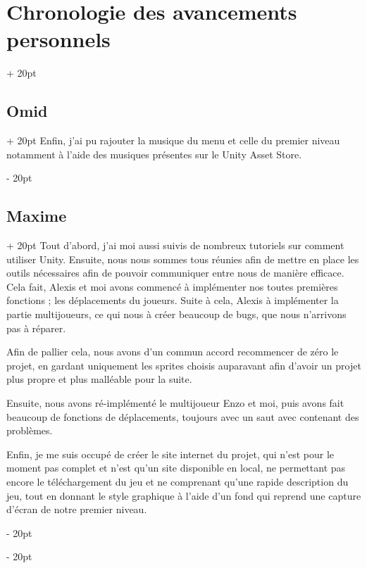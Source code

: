 \documentclass[a4paper, 12pt, twoside]{article}
\newcommand{\ind}[1][20pt]{\advance\leftskip + #1}
\newcommand{\deind}[1][20pt]{\advance\leftskip - #1}
\newenvironment{indt}[2][20pt]{#2 \par \ind[#1]}{\par \deind} %
\begin{document}
\begin{indt}{\section{Chronologie des avancements personnels}}
\begin{indt}{\subsection{Omid}}
            Enfin, j'ai pu rajouter la musique du menu et celle du premier niveau notamment à l'aide des musiques présentes sur le Unity Asset Store.
        \end{indt}

        \begin{indt}{\subsection{Maxime}}
            Tout d'abord, j'ai moi aussi suivis de nombreux tutoriels sur comment utiliser Unity. Ensuite, nous nous sommes tous réunies afin de mettre en place les outils nécessaires afin de pouvoir communiquer entre nous de manière efficace. Cela fait, Alexis et moi avons commencé à implémenter nos  toutes premières fonctions ; les déplacements du joueurs. Suite à cela, Alexis à implémenter la partie multijoueurs, ce qui nous à créer beaucoup de bugs, que nous n'arrivons pas à réparer.

            Afin de pallier cela, nous avons d'un commun accord recommencer de zéro le projet, en gardant uniquement les sprites choisis auparavant afin d'avoir un projet plus propre et plus malléable pour la suite. 
            
            Ensuite, nous avons ré-implémenté le multijoueur Enzo et moi, puis avons fait beaucoup de fonctions de déplacements, toujours avec un saut avec contenant des problèmes. 

            Enfin, je me suis occupé de créer le site internet du projet, qui n'est pour le moment pas complet et n'est qu'un site disponible en local, ne permettant pas encore le téléchargement du jeu et ne comprenant qu'une rapide description du jeu, tout en donnant le style graphique à l'aide d'un fond qui reprend une capture d'écran de notre premier niveau.
        \end{indt}
    \end{indt}
    
\end{document}
